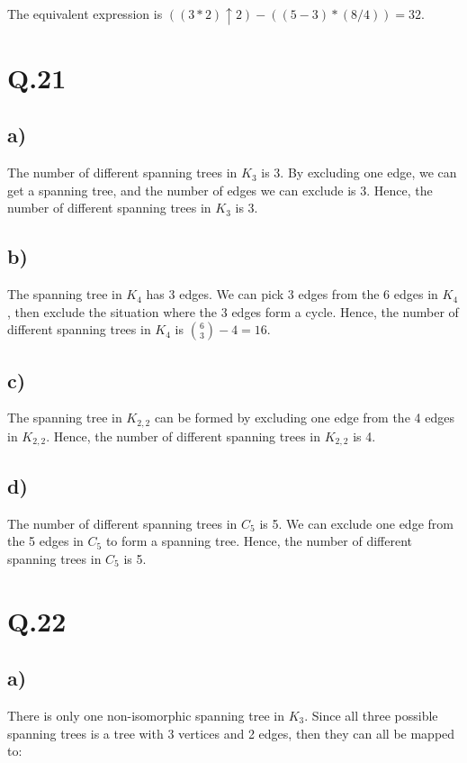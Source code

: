 \documentclass[a4paper,12pt]{article}
\begin{document}
The equivalent expression is $((3 * 2) \uparrow 2) - ((5-3)*(8/4)) = 32$.

\section*{Q.21}

\subsection*{a)}

The number of different spanning trees in $K_3$ is 3.
By excluding one edge, we can get a spanning tree, and the number of edges we can exclude is 3.
Hence, the number of different spanning trees in $K_3$ is 3.

\subsection*{b)}

The spanning tree in $K_4$ has 3 edges.
We can pick 3 edges from the 6 edges in $K_4$, then exclude the situation where the 3 edges form a cycle.
Hence, the number of different spanning trees in $K_4$ is $\binom{6}{3} - 4 = 16$.

\subsection*{c)}

The spanning tree in $K_{2,2}$ can be formed by excluding one edge from the 4 edges in $K_{2,2}$.
Hence, the number of different spanning trees in $K_{2,2}$ is 4.

\subsection*{d)}

The number of different spanning trees in $C_5$ is 5.
We can exclude one edge from the 5 edges in $C_5$ to form a spanning tree.
Hence, the number of different spanning trees in $C_5$ is 5.

\section*{Q.22}

\subsection*{a)}

There is only one non-isomorphic spanning tree in $K_3$.
Since all three possible spanning trees is a tree with 3 vertices and 2 edges, then they can all be mapped to:
\begin{center}
\end{center}
\end{document}
